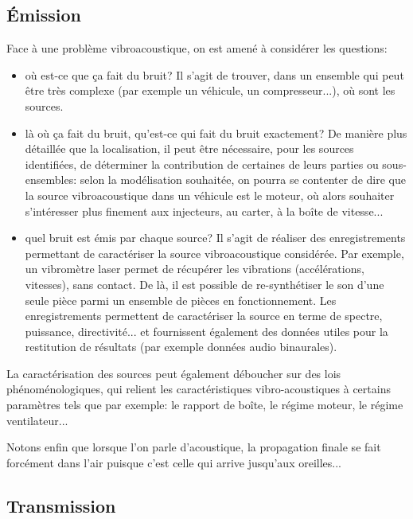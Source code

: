 \medskip
\subsection{Émission}

Face à une problème vibroacoustique, on est amené à considérer les questions:
\begin{itemize}
   \item {} où est-ce que ça fait du bruit? Il s'agit de trouver, dans un ensemble qui peut être très complexe (par exemple un véhicule, un compresseur...), où sont les sources.
   \item {} là où ça fait du bruit, qu’est-ce qui fait du bruit exactement? De manière plus détaillée que la localisation, il peut être nécessaire, pour les sources identifiées, de déterminer la contribution de certaines de leurs parties ou sous-ensembles: selon la modélisation souhaitée, on pourra se contenter de dire que la source vibroacoustique dans un véhicule est le moteur, où alors souhaiter s'intéresser plus finement aux injecteurs, au carter, à la boîte de vitesse...
   \item {} quel bruit est émis par chaque source? Il s'agit de réaliser des enregistrements permettant de caractériser la source vibroacoustique considérée. Par exemple, un vibromètre laser permet de récupérer les vibrations (accélérations, vitesses), sans contact. De là, il est possible de re-synthétiser le son d'une seule pièce parmi un ensemble de pièces en fonctionnement. Les enregistrements permettent de caractériser la source en terme de spectre, puissance, directivité... et fournissent également des données utiles pour la restitution de résultats (par exemple données audio binaurales).
\end{itemize}

\medskip
La caractérisation des sources peut également déboucher sur des lois phénoménologiques, qui relient les caractéristiques vibro-acoustiques à certains paramètres tels que par exemple: le rapport de boîte, le régime moteur, le régime ventilateur...

\medskip
Notons enfin que lorsque l'on parle d'acoustique, la propagation finale se fait forcément dans l'air puisque c'est celle qui arrive jusqu'aux oreilles...

\medskip
\subsection{Transmission}

